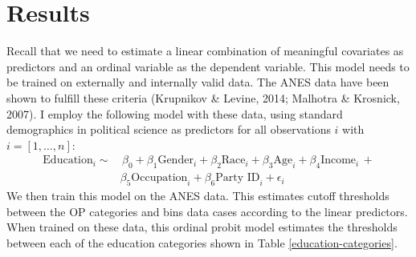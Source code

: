 \documentclass[12pt,econ]{sources/authesis}
\begin{document}
\hypertarget{ordblock-results}{%
\section{Results}\label{ordblock-results}}

Recall that we need to estimate a linear combination of meaningful covariates as predictors and an ordinal variable as the dependent variable. This model needs to be trained on externally and internally valid data. The ANES data have been shown to fulfill these criteria (Krupnikov \& Levine, 2014; Malhotra \& Krosnick, 2007). I employ the following model with these data, using standard demographics in political science as predictors for all observations \(i\) with \(i = [1,\ldots,n]\):
\begin{align}
\text{Education}_i \sim & \,\beta_0 + \beta_1 \text{Gender}_i + \beta_2 \text{Race}_i + \beta_3 \text{Age}_i + \beta_4 \text{Income}_i \,+ \nonumber \\
& \beta_5 \text{Occupation}_i + \beta_6 \text{Party ID}_i + \epsilon_i
\end{align}
We then train this model on the ANES data. This estimates cutoff thresholds between the OP categories and bins data cases according to the linear predictors. When trained on these data, this ordinal probit model estimates the thresholds between each of the education categories shown in Table \ref{education-categories}.
\end{document}
